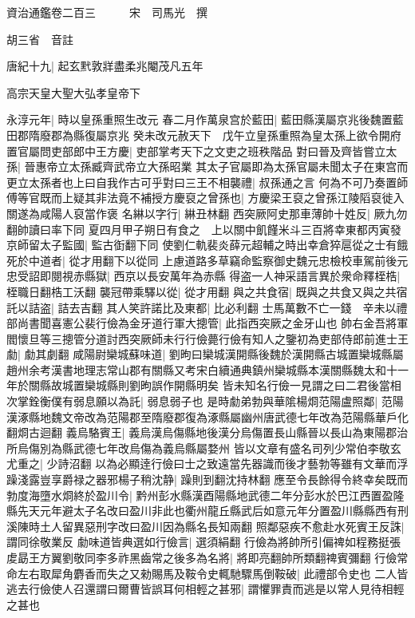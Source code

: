 資治通鑑卷二百三　　　宋　司馬光　撰

胡三省　音註

唐紀十九|{
	起玄黓敦牂盡柔兆閹茂凡五年}


高宗天皇大聖大弘孝皇帝下

永淳元年|{
	時以皇孫重照生改元}
春二月作萬泉宫於藍田|{
	藍田縣漢屬京兆後魏置藍田郡隋廢郡為縣復屬京兆}
癸未改元赦天下　戊午立皇孫重照為皇太孫上欲令開府置官屬問吏部郎中王方慶|{
	吏部掌考天下之文吏之班秩階品}
對曰晉及齊皆嘗立太孫|{
	晉惠帝立太孫臧齊武帝立大孫昭業}
其太子官屬即為太孫官屬未聞太子在東宫而更立太孫者也上曰自我作古可乎對曰三王不相襲禮|{
	叔孫通之言}
何為不可乃奏置師傅等官既而上疑其非法竟不補授方慶裒之曾孫也|{
	方慶梁王裒之曾孫江陵䧟裒徙入關遂為咸陽人裒當作褒}
名綝以字行|{
	綝丑林翻}
西突厥阿史那車薄帥十姓反|{
	厥九勿翻帥讀曰率下同}
夏四月甲子朔日有食之　上以關中飢饉米斗三百將幸東都丙寅發京師留太子監國|{
	監古衘翻下同}
使劉仁軌裴炎薛元超輔之時出幸倉猝扈從之士有餓死於中道者|{
	從才用翻下以從同}
上慮道路多草竊命監察御史魏元忠檢校車駕前後元忠受詔即閱視赤縣獄|{
	西京以長安萬年為赤縣}
得盗一人神采語言異於衆命釋桎梏|{
	桎職日翻梏工沃翻}
襲冠帶乘驛以從|{
	從才用翻}
與之共食宿|{
	既與之共食又與之共宿}
託以詰盗|{
	詰去吉翻}
其人笑許諾比及東都|{
	比必利翻}
士馬萬數不亡一錢　辛未以禮部尚書聞喜憲公裴行儉為金牙道行軍大摠管|{
	此指西突厥之金牙山也}
帥右金吾將軍閻懷旦等三摠管分道討西突厥師未行行儉薨行儉有知人之鑒初為吏部侍郎前進士王勮|{
	勮其劇翻}
咸陽尉欒城蘇味道|{
	劉昫曰欒城漢開縣後魏於漢開縣古城置欒城縣屬趙州余考漢書地理志常山郡有關縣又考宋白續通典鎮州欒城縣本漢關縣魏太和十一年於關縣故城置欒城縣則劉昫誤作開縣明矣}
皆未知名行儉一見謂之曰二君後當相次掌銓衡僕有弱息願以為託|{
	弱息弱子也}
是時勮弟勃與華隂楊烱范陽盧照鄰|{
	范陽漢涿縣地魏文帝改為范陽郡至隋廢郡復為涿縣屬幽州唐武德七年改為范陽縣華戶化翻烱古迴翻}
義烏駱賓王|{
	義烏漢烏傷縣地後漢分烏傷置長山縣晉以長山為東陽郡治所烏傷別為縣武德七年改烏傷為義烏縣屬婺州}
皆以文章有盛名司列少常伯李敬玄尤重之|{
	少詩沼翻}
以為必顯逹行儉曰士之致遠當先器識而後才藝勃等雖有文華而浮躁淺露豈享爵禄之器邪楊子稍沈静|{
	躁則到翻沈持林翻}
應至令長餘得令終幸矣既而勃度海墮水烱終於盈川令|{
	黔州彭水縣漢酉陽縣地武德二年分彭水於巴江西置盈隆縣先天元年避太子名改曰盈川非此也衢州龍丘縣武后如意元年分置盈川縣縣西有刑溪陳時土人留異惡刑字改曰盈川因為縣名長知兩翻}
照鄰惡疾不愈赴水死賓王反誅|{
	謂同徐敬業反}
勮味道皆典選如行儉言|{
	選須絹翻}
行儉為將帥所引偏禆如程務挺張䖍勗王方翼劉敬同李多祚黑齒常之後多為名將|{
	將即亮翻帥所類翻禆賓彌翻}
行儉常命左右取犀角麝香而失之又勑賜馬及鞍令史輒馳驟馬倒鞍破|{
	此禮部令史也}
二人皆逃去行儉使人召還謂曰爾曹皆誤耳何相輕之甚邪|{
	謂懼罪責而逃是以常人見待相輕之甚也}
